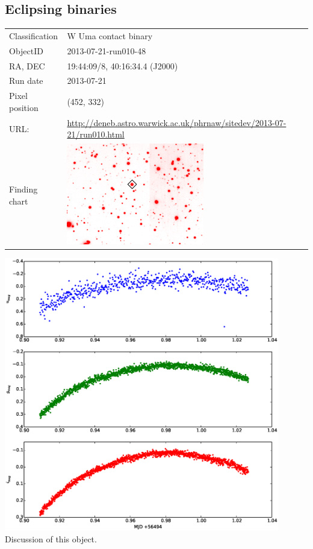 \subsection{Eclipsing binaries}

  \begin{tabular}{l l}
  Classification & W Uma contact binary \\
  ObjectID & 2013-07-21-run010-48 \\
  RA, DEC & 19:44:09/8, 40:16:34.4 (J2000) \\
  Run date & 2013-07-21 \\
  Pixel position & (452, 332) \\
  URL: & \small \url{http://deneb.astro.warwick.ac.uk/phrnaw/sitedev/2013-07-21/run010.html} \\
  Finding chart & \includegraphics[width=60mm]{images/2013-07-21-run010-48.png} \\
  \end{tabular}
  \includegraphics[width=120mm]{images/2013-07-21-run010-48_lightcurve.eps} \\
  Discussion of this object.


